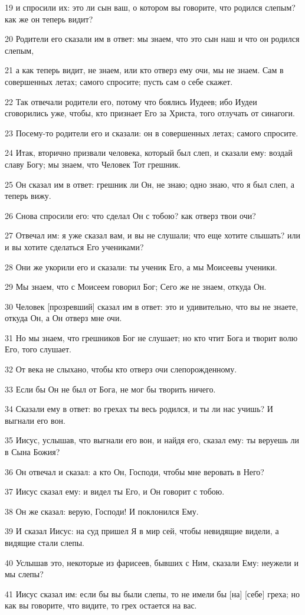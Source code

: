 \par 19 и спросили их: это ли сын ваш, о котором вы говорите, что родился слепым? как же он теперь видит?
\par 20 Родители его сказали им в ответ: мы знаем, что это сын наш и что он родился слепым,
\par 21 а как теперь видит, не знаем, или кто отверз ему очи, мы не знаем. Сам в совершенных летах; самого спросите; пусть сам о себе скажет.
\par 22 Так отвечали родители его, потому что боялись Иудеев; ибо Иудеи сговорились уже, чтобы, кто признает Его за Христа, того отлучать от синагоги.
\par 23 Посему-то родители его и сказали: он в совершенных летах; самого спросите.
\par 24 Итак, вторично призвали человека, который был слеп, и сказали ему: воздай славу Богу; мы знаем, что Человек Тот грешник.
\par 25 Он сказал им в ответ: грешник ли Он, не знаю; одно знаю, что я был слеп, а теперь вижу.
\par 26 Снова спросили его: что сделал Он с тобою? как отверз твои очи?
\par 27 Отвечал им: я уже сказал вам, и вы не слушали; что еще хотите слышать? или и вы хотите сделаться Его учениками?
\par 28 Они же укорили его и сказали: ты ученик Его, а мы Моисеевы ученики.
\par 29 Мы знаем, что с Моисеем говорил Бог; Сего же не знаем, откуда Он.
\par 30 Человек [прозревший] сказал им в ответ: это и удивительно, что вы не знаете, откуда Он, а Он отверз мне очи.
\par 31 Но мы знаем, что грешников Бог не слушает; но кто чтит Бога и творит волю Его, того слушает.
\par 32 От века не слыхано, чтобы кто отверз очи слепорожденному.
\par 33 Если бы Он не был от Бога, не мог бы творить ничего.
\par 34 Сказали ему в ответ: во грехах ты весь родился, и ты ли нас учишь? И выгнали его вон.
\par 35 Иисус, услышав, что выгнали его вон, и найдя его, сказал ему: ты веруешь ли в Сына Божия?
\par 36 Он отвечал и сказал: а кто Он, Господи, чтобы мне веровать в Него?
\par 37 Иисус сказал ему: и видел ты Его, и Он говорит с тобою.
\par 38 Он же сказал: верую, Господи! И поклонился Ему.
\par 39 И сказал Иисус: на суд пришел Я в мир сей, чтобы невидящие видели, а видящие стали слепы.
\par 40 Услышав это, некоторые из фарисеев, бывших с Ним, сказали Ему: неужели и мы слепы?
\par 41 Иисус сказал им: если бы вы были слепы, то не имели бы [на] [себе] греха; но как вы говорите, что видите, то грех остается на вас.

